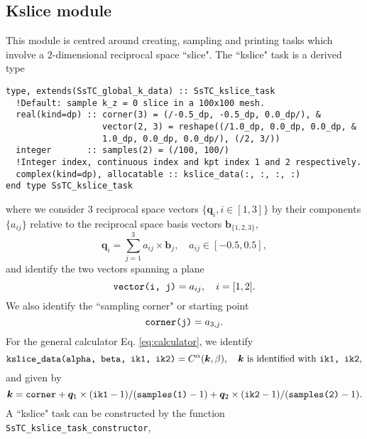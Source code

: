 \documentclass[10pt,a4paper]{article}
\begin{document}
\subsection{Kslice module}
This module is centred around creating, sampling and printing tasks which involve a 2-dimensional reciprocal space ``slice". The ``kslice" task is a derived type
\begin{lstlisting}[caption={Derived type corresponding to a ``kslice" task.},captionpos=b]
type, extends(SsTC_global_k_data) :: SsTC_kslice_task
  !Default: sample k_z = 0 slice in a 100x100 mesh.
  real(kind=dp) :: corner(3) = (/-0.5_dp, -0.5_dp, 0.0_dp/), &
                   vector(2, 3) = reshape((/1.0_dp, 0.0_dp, 0.0_dp, &
                   1.0_dp, 0.0_dp, 0.0_dp/), (/2, 3/))
  integer       :: samples(2) = (/100, 100/)
  !Integer index, continuous index and kpt index 1 and 2 respectively.
  complex(kind=dp), allocatable :: kslice_data(:, :, :, :)
end type SsTC_kslice_task
\end{lstlisting}
where we consider 3 reciprocal space vectors $\{\bm{q}_i, i\in[1, 3]\}$ by their components $\{a_{ij}\}$ relative to the reciprocal space basis vectors $\bm{b}_{\{1, 2, 3\}}$,
\begin{equation}\label{eq:vec_coords_slice}
\bm{q}_i = \sum_{j=1}^3 a_{ij}\times \bm{b}_j, \quad a_{ij}\in\left[-0.5, 0.5\right],
\end{equation}
and identify the two vectors spanning a plane
\begin{equation}
\verb|vector(i, j)| = a_{ij}, \quad i = [1, 2].
\end{equation}
We also identify the ``sampling corner" or starting point
\begin{equation}
\verb|corner(j)| = a_{3, j}.
\end{equation}
For the general calculator Eq. \eqref{eq:calculator}, we identify
\begin{equation}
\verb|kslice_data(alpha, beta, ik1, ik2)| = C^{\alpha}(\bm{k},\beta),\quad \bm{k}\text{ is identified with } \verb|ik1, ik2|,
\end{equation}
and given by
\begin{equation}
\bm{k} = \verb|corner| + \bm{q}_1\times (\verb|ik1|-1)/(\verb|samples(1)| - 1) + \bm{q}_2\times (\verb|ik2|-1)/(\verb|samples(2)| - 1).
\end{equation}
A ``kslice" task can be constructed by the function \verb|SsTC_kslice_task_constructor|,
\end{document}
